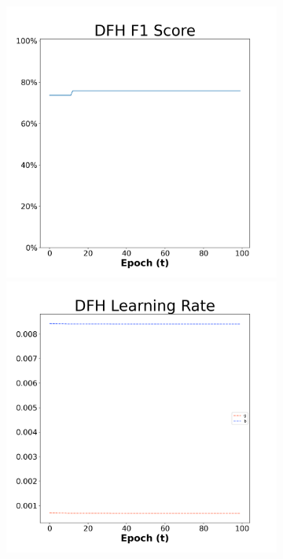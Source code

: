 \begin{figure}[H]
    \centering %
\begin{subfigure}{0.3\textwidth}
  \includegraphics[width=\linewidth]{images/exper2/Ionosphere/DFH_0.01_f1.png}
    \includegraphics[width=\linewidth]{images/exper2/Ionosphere/DFH_0.01_lr.png}

\end{subfigure}
\end{figure}
